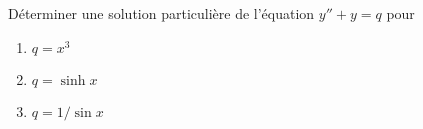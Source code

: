 
\begin{exercice}\label{exoEqsDiff0015}

Déterminer une solution particulière de l'équation
$y''+y=q$ pour

\begin{enumerate}

\item $ q = x^3$
\item $ q = \sinh x$
\item $ q = 1/\sin x$
\end{enumerate}

\end{exercice}
